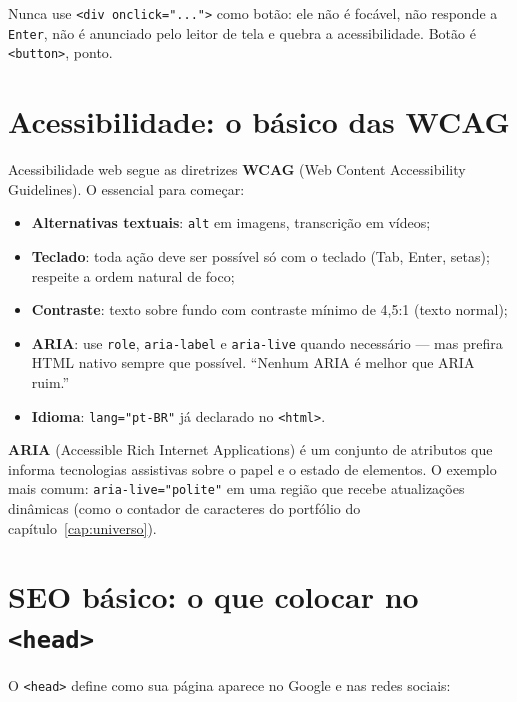 \begin{caixadica}
Nunca use \texttt{<div onclick="...">} como botão: ele não é focável, não
responde a \texttt{Enter}, não é anunciado pelo leitor de tela e quebra a
acessibilidade. Botão é \texttt{<button>}, ponto.
\end{caixadica}

\section{Acessibilidade: o básico das WCAG}

Acessibilidade web segue as diretrizes \textbf{WCAG} (Web Content Accessibility
Guidelines). O essencial para começar:

\begin{itemize}[leftmargin=*, itemsep=0.4em]
  \item \textbf{Alternativas textuais}: \texttt{alt} em imagens, transcrição em vídeos;
  \item \textbf{Teclado}: toda ação deve ser possível só com o teclado (Tab,
  Enter, setas); respeite a ordem natural de foco;
  \item \textbf{Contraste}: texto sobre fundo com contraste mínimo de 4,5:1
  (texto normal);
  \item \textbf{ARIA}: use \texttt{role}, \texttt{aria-label} e
  \texttt{aria-live} quando necessário — mas prefira HTML nativo sempre que
  possível. ``Nenhum ARIA é melhor que ARIA ruim.''
  \item \textbf{Idioma}: \texttt{lang="pt-BR"} já declarado no \texttt{<html>}.
\end{itemize}

\begin{caixaconceito}
\textbf{ARIA} (Accessible Rich Internet Applications) é um conjunto de
atributos que informa tecnologias assistivas sobre o papel e o estado de
elementos. O exemplo mais comum: \texttt{aria-live="polite"} em uma região que
recebe atualizações dinâmicas (como o contador de caracteres do portfólio do
capítulo~\ref{cap:universo}).
\end{caixaconceito}

\section{SEO básico: o que colocar no \texttt{<head>}}

O \texttt{<head>} define como sua página aparece no Google e nas redes sociais:

